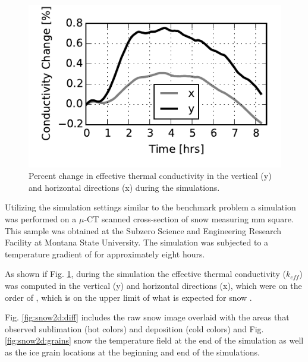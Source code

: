 \begin{figure}[H]
  \includegraphics[width=\linewidth]{figures/pika_keff.pdf}
  \caption{Percent change in effective thermal conductivity in the vertical (y) and horizontal directions (x) during the simulations.}
  \label{fig:keff}
\end{figure}

Utilizing the simulation settings similar to the benchmark problem a simulation was performed on a $\mu$-CT scanned cross-section of snow measuring \unit[5]{mm} square. This sample was obtained at the Subzero Science and Engineering Research Facility at Montana State University. The simulation was subjected to a temperature gradient of  for approximately eight hours.

As shown if Fig. \ref{fig:keff}, during the simulation the effective thermal conductivity ($k_{eff}$) was computed in the vertical (y) and horizontal directions (x), which were on the order of , which is on the upper limit of what is expected for snow \citep{sturm1997thermal}.

Fig. \ref{fig:snow2d:diff} includes the raw snow image overlaid with the areas that observed sublimation (hot colors) and deposition (cold colors) and Fig. \ref{fig:snow2d:grains} snow the temperature field at the end of the simulation as well as the ice grain locations at the beginning and end of the simulations.

